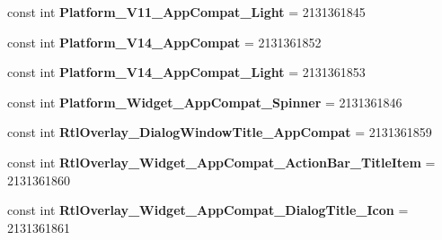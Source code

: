 \begin{DoxyCompactItemize}
\item 
\mbox{\label{class_pinned_app_1_1_droid_1_1_resource_1_1_style_abf086cb4465b618646856ffe2067f975}} 
const int {\bfseries Platform\+\_\+\+V11\+\_\+\+App\+Compat\+\_\+\+Light} = 2131361845
\item 
\mbox{\label{class_pinned_app_1_1_droid_1_1_resource_1_1_style_a472e4b8c9835ef766e1154a35e74032b}} 
const int {\bfseries Platform\+\_\+\+V14\+\_\+\+App\+Compat} = 2131361852
\item 
\mbox{\label{class_pinned_app_1_1_droid_1_1_resource_1_1_style_ac146a5cdaf92abd336a79b9fac1e8494}} 
const int {\bfseries Platform\+\_\+\+V14\+\_\+\+App\+Compat\+\_\+\+Light} = 2131361853
\item 
\mbox{\label{class_pinned_app_1_1_droid_1_1_resource_1_1_style_af6c061bb6bc8f54564ca124372d81639}} 
const int {\bfseries Platform\+\_\+\+Widget\+\_\+\+App\+Compat\+\_\+\+Spinner} = 2131361846
\item 
\mbox{\label{class_pinned_app_1_1_droid_1_1_resource_1_1_style_aee783df2799eb3ec4132e05b5de5bcc2}} 
const int {\bfseries Rtl\+Overlay\+\_\+\+Dialog\+Window\+Title\+\_\+\+App\+Compat} = 2131361859
\item 
\mbox{\label{class_pinned_app_1_1_droid_1_1_resource_1_1_style_aa8942b190fd1b343ed2bd6de5c58e427}} 
const int {\bfseries Rtl\+Overlay\+\_\+\+Widget\+\_\+\+App\+Compat\+\_\+\+Action\+Bar\+\_\+\+Title\+Item} = 2131361860
\item 
\mbox{\label{class_pinned_app_1_1_droid_1_1_resource_1_1_style_a37b7536c388663d7d66b35809b9d8614}} 
const int {\bfseries Rtl\+Overlay\+\_\+\+Widget\+\_\+\+App\+Compat\+\_\+\+Dialog\+Title\+\_\+\+Icon} = 2131361861
\item 
\mbox{\label{class_pinned_app_1_1_droid_1_1_resource_1_1_style_a9e4f1f1754079774047a79152c065bbd}} 

\end{DoxyCompactItemize}
